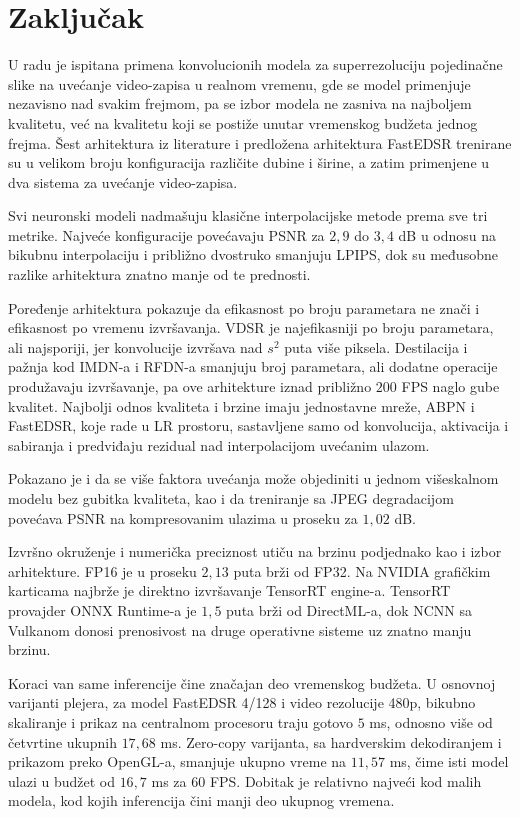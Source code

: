 \documentclass[12pt,a4paper]{article}
\begin{document}
\section{Zaključak}
\label{sec:zakljucak}

U radu je ispitana primena konvolucionih modela za superrezoluciju pojedinačne slike na uvećanje video-zapisa u realnom vremenu, gde se model primenjuje nezavisno nad svakim frejmom, pa se izbor modela ne zasniva na najboljem kvalitetu, već na kvalitetu koji se postiže unutar vremenskog budžeta jednog frejma. Šest arhitektura iz literature i predložena arhitektura FastEDSR trenirane su u velikom broju konfiguracija različite dubine i širine, a zatim primenjene u dva sistema za uvećanje video-zapisa.

Svi neuronski modeli nadmašuju klasične interpolacijske metode prema sve tri metrike. Najveće konfiguracije povećavaju PSNR za $2{,}9$ do $3{,}4$ dB u odnosu na bikubnu interpolaciju i približno dvostruko smanjuju LPIPS, dok su međusobne razlike arhitektura znatno manje od te prednosti.

Poređenje arhitektura pokazuje da efikasnost po broju parametara ne znači i efikasnost po vremenu izvršavanja. VDSR je najefikasniji po broju parametara, ali najsporiji, jer konvolucije izvršava nad $s^2$ puta više piksela. Destilacija i pažnja kod IMDN-a i RFDN-a smanjuju broj parametara, ali dodatne operacije produžavaju izvršavanje, pa ove arhitekture iznad približno $200$ FPS naglo gube kvalitet. Najbolji odnos kvaliteta i brzine imaju jednostavne mreže, ABPN i FastEDSR, koje rade u LR prostoru, sastavljene samo od konvolucija, aktivacija i sabiranja i predviđaju rezidual nad interpolacijom uvećanim ulazom.

Pokazano je i da se više faktora uvećanja može objediniti u jednom višeskalnom modelu bez gubitka kvaliteta, kao i da treniranje sa JPEG degradacijom povećava PSNR na kompresovanim ulazima u proseku za $1{,}02$ dB.

Izvršno okruženje i numerička preciznost utiču na brzinu podjednako kao i izbor arhitekture. FP16 je u proseku $2{,}13$ puta brži od FP32. Na NVIDIA grafičkim karticama najbrže je direktno izvršavanje TensorRT engine-a. TensorRT provajder ONNX Runtime-a je $1{,}5$ puta brži od DirectML-a, dok NCNN sa Vulkanom donosi prenosivost na druge operativne sisteme uz znatno manju brzinu.

Koraci van same inferencije čine značajan deo vremenskog budžeta. U osnovnoj varijanti plejera, za model FastEDSR 4/128 i video rezolucije 480p, bikubno skaliranje i prikaz na centralnom procesoru traju gotovo $5$ ms, odnosno više od četvrtine ukupnih $17{,}68$ ms. Zero-copy varijanta, sa hardverskim dekodiranjem i prikazom preko OpenGL-a, smanjuje ukupno vreme na $11{,}57$ ms, čime isti model ulazi u budžet od $16{,}7$ ms za $60$ FPS. Dobitak je relativno najveći kod malih modela, kod kojih inferencija čini manji deo ukupnog vremena.
\end{document}
